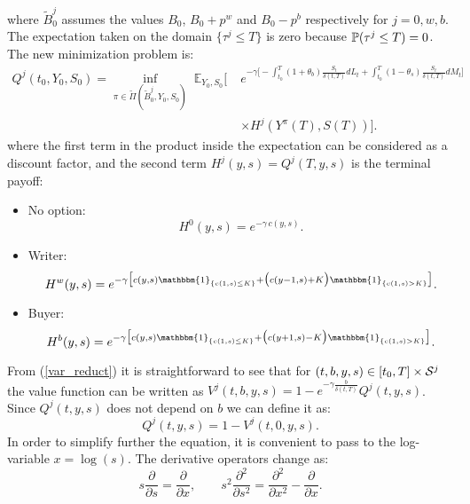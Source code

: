where $\tilde B^j_0$ assumes the values $B_0$, $B_0 + p^w$ and $B_0 - p^b$ respectively for $j=0,w,b$. 
The expectation taken on the domain $\{ \tau^j \leq T\}$ is zero because $\mathbb{P}(\tau^j \leq T)=0$.
The new minimization problem is: 
\begin{align}\label{minimization}
Q^j(t_0,Y_0,S_0) = \inf_{\pi \in \tilde \Pi(\tilde B^j_0,Y_0,S_0)} \; \mathbb{E}_{Y_0,S_0}\biggl[ \; &
	     e^{-\gamma \bigl[ -\int_{t_0}^T (1+\theta_b) \frac{S_t}{\delta(t,T)} dL_t +
	     \int_{t_0}^T (1-\theta_s) \frac{S_t}{\delta(t,T)} dM_t \bigr] } \, \\ \nonumber 
	     & \times H^j(Y^{\pi}(T),S(T)) \bigg].  
\end{align}
where the first term in the product inside the expectation can be considered as a discount factor, and the second term 
$H^j(y,s) = Q^j(T,y,s)$ is the terminal payoff:
\begin{itemize}
 \item No option:
 \begin{equation}\label{terminal_c}
  H^0(y,s) = e^{-\gamma \, c(y,s)}.
 \end{equation}
 \item Writer:
  \begin{equation}\label{terminal_w}
  H^w(y,s) = e^{-\gamma \bigl[ c(y,s)\mathbbm{1}_{\{c(1,s) \leq K\}} + 
 \bigl( c( y-1,s) + K \bigr) \mathbbm{1}_{\{c(1,s)>K\}} \bigr] }.
 \end{equation}
 \item Buyer:
  \begin{equation}\label{terminal_b}
  H^b(y,s) = e^{-\gamma \bigl[ c(y,s)\mathbbm{1}_{\{c(1,s) \leq K\}} + 
 \bigl( c( y+1,s) - K \bigr) \mathbbm{1}_{\{c(1,s)>K\}} \bigr] }.
 \end{equation}
\end{itemize}
From (\ref{var_reduct}) it is straightforward to see that for $(t,b,y,s) \in [t_0,T] \times \mathcal{S}^j$ the value function can be written as 
$V^j(t,b,y,s) = 1 - e^{-\gamma \frac{b}{\delta(t,T)}} Q^j(t,y,s)$. Since $Q^j(t,y,s)$ does not depend on $b$ we can define it as:
\begin{equation}\label{Q_def}
 Q^j(t,y,s) = 1 - V^j(t,0,y,s).
\end{equation}
In order to simplify further the equation, it is convenient to pass to the log-variable $ x = \log(s)$.
The derivative operators change as:
\begin{equation}\label{log_var}
s \frac{\partial}{\partial s} = \frac{\partial}{\partial x}, \hspace{2em} 
s^2 \frac{\partial^2}{\partial s^2} = \frac{\partial^2}{\partial x^2} - \frac{\partial}{\partial x} . 
\end{equation}
